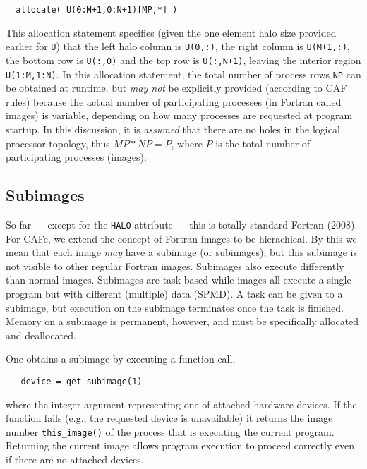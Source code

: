 \begin{verbatim}
  allocate( U(0:M+1,0:N+1)[MP,*] )
\end{verbatim}

This allocation statement specifies (given the one element halo size
provided earlier for \texttt{U}) that the left halo column is
\texttt{U(0,:)}, the right column is \texttt{U(M+1,:)}, the bottom row
is \texttt{U(:,0)} and the top row is \texttt{U(:,N+1)}, leaving the
interior region \texttt{U(1:M,1:N)}.  In this allocation statement,
the total number of process rows \texttt{NP} can be obtained at
runtime, but \emph{may not} be explicitly provided (according to CAF
rules) because the actual number of participating processes (in
Fortran called images) is variable, depending on how many processes
are requested at program startup.  In this discussion, it is
\emph{assumed} that there are no holes in the logical processor
topology, thus $MP*NP = P$, where $P$ is the total number of
participating processes (images).

\subsection{Subimages}


So far --- except for the \texttt{HALO} attribute --- this is totally
standard Fortran (2008).  For CAFe, we extend the concept of Fortran
images to be hierachical.  By this we mean that each image \emph{may}
have a subimage (or subimages), but this subimage is not visible to
other regular Fortran images.  Subimages also execute differently than
normal images.  Subimages are task based while images all execute a
single program but with different (multiple) data (SPMD).  A task can
be given to a subimage, but execution on the subimage terminates once
the task is finished.  Memory on a subimage is permanent, however, and
must be specifically allocated and deallocated.

One obtains a subimage by executing a function call,
\begin{verbatim}
   device = get_subimage(1)
\end{verbatim}

where the integer argument representing one of attached hardware
devices.  If the function fails (e.g., the requested
device is unavailable) it returns the image number
\texttt{this\_image()} of the process that is executing the current
program.  Returning the current image allows program execution to
proceed correctly even if there are no attached devices.

